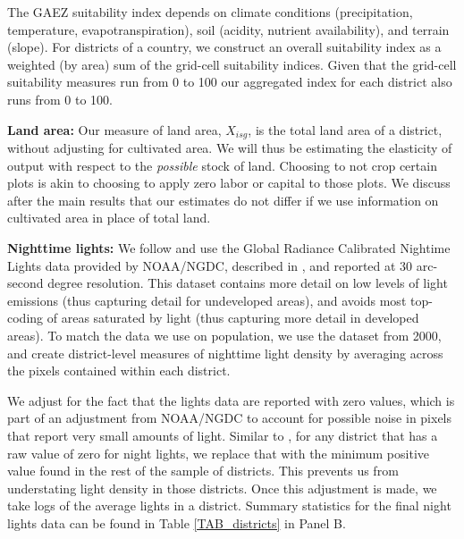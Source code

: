 \documentclass[11pt]{article}
\begin{document}
The GAEZ suitability index depends on climate conditions (precipitation, temperature, evapotranspiration), soil (acidity, nutrient availability), and terrain (slope). For districts of a country, we construct an overall suitability index as a weighted (by area) sum of the grid-cell suitability indices. Given that the grid-cell suitability measures run from 0 to 100  our aggregated index for each district also runs from 0 to 100.

\vspace{.5cm}\noindent\textbf{Land area:} Our measure of land area, $X_{isg}$, is the total land area of a district, without adjusting for cultivated area. We will thus be estimating the elasticity of output with respect to the \textit{possible} stock of land. Choosing to not crop certain plots is akin to choosing to apply zero labor or capital to those plots. We discuss after the main results that our estimates do not differ if we use information on cultivated area in place of total land.

\vspace{.5cm}\noindent\textbf{Nighttime lights:} We follow \citet{hssw2016} and use the Global Radiance Calibrated Nightime Lights data provided by NOAA/NGDC, described in \citet{Elvidge1999}, and reported at 30 arc-second degree resolution. This dataset contains more detail on low levels of light emissions (thus capturing detail for undeveloped areas), and avoids most top-coding of areas saturated by light (thus capturing more detail in developed areas). To match the data we use on population, we use the dataset from 2000, and create district-level measures of nighttime light density by averaging across the pixels contained within each district.

We adjust for the fact that the lights data are reported with zero values, which is part of an adjustment from NOAA/NGDC to account for possible noise in pixels that report very small amounts of light. Similar to \citet{hssw2016}, for any district that has a raw value of zero for night lights, we replace that with the minimum positive value found in the rest of the sample of districts. This prevents us from understating light density in those districts. Once this adjustment is made, we take logs of the average lights in a district. Summary statistics for the final night lights data can be found in Table \ref{TAB_districts} in Panel B.
\end{document}
